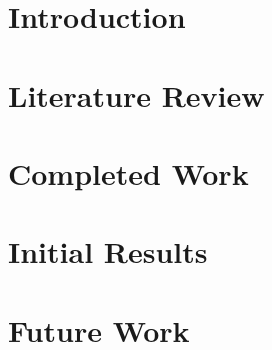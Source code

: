 \documentclass[a4paper,11pt,twoside]{report}
\author{\me}
\begin{document}


\normalsize

%

\begin{singlespacing}
    \tableofcontents
\end{singlespacing}

\doublespacing
\chapter{Introduction}\label{chapter:Introduction}
\setcounter{page}{0}


\chapter{Literature Review}\label{chapter:Literature Review}


\chapter{Completed Work}\label{chapter:Completed Work}


\begingroup
\renewcommand{\cleardoublepage}{}
\renewcommand{\clearpage}{}
\vspace{44pt}
\chapter{Initial Results}\label{chapter:Initial Results}
\endgroup


\chapter{Future Work}\label{chapter:Future Work}


%
\end{document}
